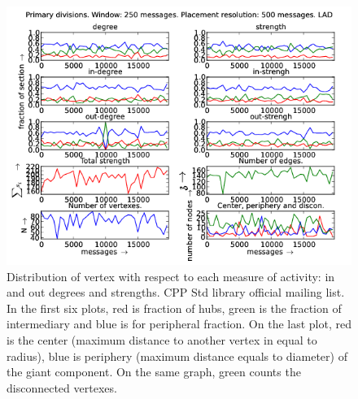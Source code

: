 \documentclass[%
 aip,
 jmp,%
 amsmath,amssymb,
 reprint,%
]{revtex4-1}
\begin{document}
\begin{figure}[hbtp] 
   \centering
        \includegraphics[width=\textwidth]{figs/LAD/250}
    \caption{Distribution of vertex with respect to each measure of activity: in and out degrees and strengths. CPP Std library official mailing list. In the first six plots, red is fraction of hubs, green is the fraction of intermediary and blue is for peripheral fraction. On the last plot, red is the center (maximum distance to another vertex in equal to radius), blue is periphery (maximum distance equals to diameter) of the giant component. On the same graph, green counts the disconnected vertexes.}
    \label{fig:lad250}
\end{figure}
\end{document}
